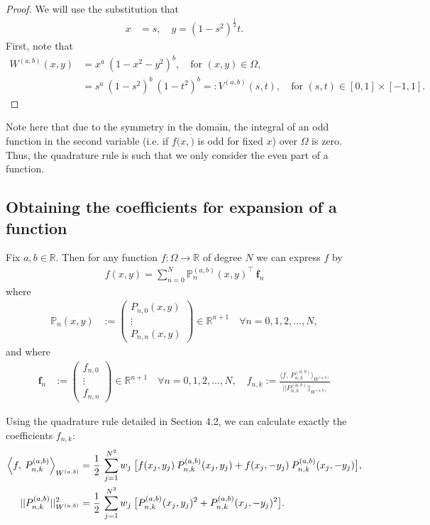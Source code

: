 \documentclass[11pt, oneside]{article}   	%
\newcommand{\half}{\frac{1}{2}}
\newcommand{\R}{\mathbb{R}}
\newcommand{\bigP}{\mathbb{P}}
\newcommand{\Pnk}{P_{n,k}}
\begin{document}
\begin{proof}
We will use the substitution that
\begin{align}
x &= s, \quad y = (1-s^2)^\half t.
\end{align}
First, note that
\begin{align}
W^{(a,b)}(x,y) &= x^a \: (1-x^2-y^2)^b, \quad \text{for } (x,y) \in \Omega, \\
		      &= s^a \: (1-s^2)^{b} \: (1-t^2)^b =: V^{(a,b)}(s,t), \quad \text{for } (s,t) \in [0,1] \times [-1,1].
\end{align}
\end{proof}

Note here that due to the symmetry in the domain, the integral of an odd function in the second variable (i.e. if $f(x, \dot)$ is odd for fixed $x$) over $\Omega$ is zero. Thus, the quadrature rule is such that we only consider the even part of a function.



\subsection{Obtaining the coefficients for expansion of a function}

Fix \(a,b \in \R\). Then for any function \(f : \Omega \to \R\) of degree $N$ we can express \(f\) by
\begin{align*}
f(x,y) = \sum_{n=0}^N \bigP_n^{(a,b)}(x,y)^\top \: \mathbf{f}_n
\end{align*}
where
\begin{align*}
\bigP_n(x,y) &:= \begin{pmatrix}
		P_{n,0}(x,y) \\
		\vdots \\
		P_{n,n}(x,y)
	\end{pmatrix} \in \R^{n+1} \quad \forall n = 0,1,2,\dots,N,
\end{align*}
and where
\begin{align*}
\mathbf{f}_n &:= \begin{pmatrix}
		f_{n,0} \\
		\vdots \\
		f_{n,n}
	\end{pmatrix} \in \R^{n+1} \quad \forall n = 0,1,2,\dots,N, \quad
f_{n,k} := \frac{\langle f, \: \Pnk^{(a,b)} \rangle_{W^{(a,b)}}}{|| \Pnk^{(a,b)} ||_{W^{(a,b)}}}
\end{align*}

Using the quadrature rule detailed in Section 4.2, we can calculate exactly the coefficients $f_{n,k}$: 
\begin{align}
	\ip< f, \: \Pnk^{(a,b)} >_{W^{(a,b)}} &= \half \: \sum_{j=1}^{N^2} w_j \: \big[ f(x_j, y_j) \: \Pnk^{(a,b)}(x_j, y_j) +f(x_j, -y_j) \: \Pnk^{(a,b)}(x_j, -y_j) \big], \\
	|| \Pnk^{(a,b)} ||_{W^{(a,b)}}^2 &= \half \: \sum_{j=1}^{N^2} w_j \: \big[ \Pnk^{(a,b)}(x_j, y_j)^2 + \Pnk^{(a,b)}(x_j, -y_j)^2 \big].
\end{align}
\end{document}
